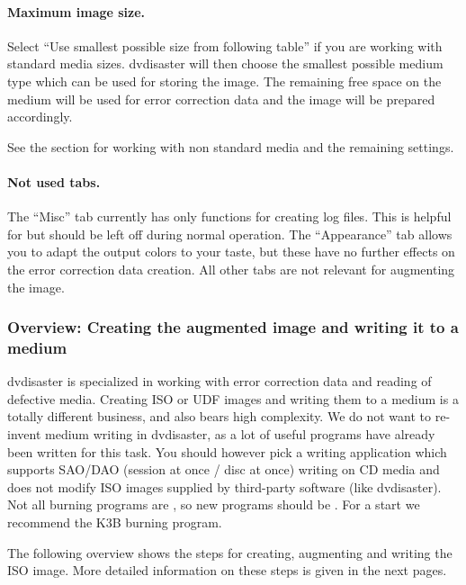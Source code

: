 \paragraph{Maximum image size.} Select
``Use smallest possible size from following table'' if you are working
with standard media sizes. dvdisaster will then choose the
smallest possible medium type which can be used for
storing the image. The remaining free space on the medium
will be used for error correction data and the image will
be prepared accordingly.

See the  section
for working with non standard media and the remaining settings. 

\paragraph{Not used tabs.} The ``Misc'' tab currently has only
functions for creating log files. This is helpful for
but should be left off during normal operation.
The ``Appearance'' tab allows you to adapt the output colors
to your taste, but these have no further effects on the error correction data creation.
All other tabs are not relevant for augmenting the image.
 
\subsubsection{Overview: Creating the augmented image and writing it to a medium}
\label{howto-augment-overview}

dvdisaster is specialized in working with error correction data and reading
of defective media. Creating ISO or UDF images and writing them to a medium
is a totally different business, and also bears high complexity. We do not
want to re-invent medium writing in dvdisaster, as a lot of useful programs
have already been written for this task. You should however pick a writing
application which supports SAO/DAO (session at once / disc at once) writing
on CD media and does not modify ISO images supplied by third-party software
(like dvdisaster). Not all burning programs are , so new programs should be
. For a start we recommend the K3B burning program.

\bigskip

The following overview shows the steps for creating, augmenting and writing the
ISO image. More detailed information on these steps is given in the next pages.


